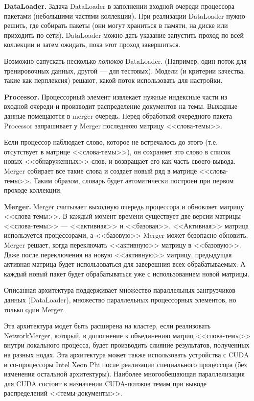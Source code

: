\documentclass[12pt]{article}
\begin{document}
{\bf DataLoader.}$\;$Задача DataLoader в заполнении входной очереди процессора пакетами (небольшими частями коллекции). При реализации DataLoader нужно решить, где собирать пакеты (они могут храниться в памяти, на диске или приходить по сети). DataLoader можно дать указание запустить проход по всей коллекции и затем ожидать, пока этот проход завершиться.

Возможно сапускать несколько \emph{потоков} DataLoader. 
(Например, один поток для тренировочных данных, другой --- для тестовых).
Модели (и критерии качества, такие как перплексия) решают, какой поток использовать для настройки.

{\bf Processor.}$\;$Процессорный элемент извлекает нужные индексные части из входной очереди и производит распределение документов на темы. Выходные данные помещаются в merger очередь. Перед обработкой очередного пакета Processor запрашивает у Merger последнюю матрицу <<слова-темы>>.

Если процессор наблюдает слово, которое не встречалось до этого (т.е. отсутствует в матрице <<слова-темы>>), он сохраняет это слово в список новых <<обнаруженных>> слов, и возвращает его как часть своего вывода. Merger собирает все такие слова и создаёт новый ряд в матрице <<слова-темы>>. Таким образом, словарь будет автоматически построен при первом проходе коллекции. 

{\bf Merger.}$\;$Merger считывает выходную очередь процессора и обновляет матрицу <<слова-темы>>. В каждый момент времени существует две версии матрицы <<слова-темы>> --- <<активная>> и <<базовая>>. <<Активная>> матрица используется процессорами, а <<базовую>> Merger может безопасно обновить. Merger решает, когда переключать <<активную>> матрицу в <<базовую>>. Даже после переключения на новую <<активную>> матрицу, предыдущая активная матрица будет использоваться для заверешния всех обрабатываемых. А каждый новый пакет будет обрабатываться уже с использованием новой матрицы. 

Описанная архитектура поддерживает множество параллельных зангрузчиков данных (DataLoader), множество параллельных процессорных элементов, но только один Merger.

Эта архитектура модет быть расширена на кластер, если реализовать NetworkMerger, который, в дополнение к объединению матриц <<слова-темы>> внутри локального процесса, будет производить слияние результатов, полученных на разных нодах. Эта архитектура может также использовать устройства с CUDA и со-процессоры Intel Xeon Phi после реализации специального процессора (без изменения остальной архитектуры). Наиболее многообещающая параллелизация для CUDA состоит в назначении CUDA-потоков темам при выводе распределений <<темы-документы>>. 
\end{document}
